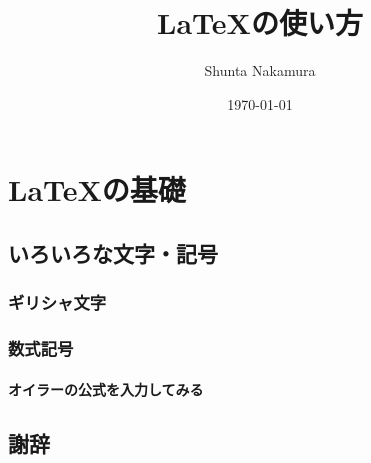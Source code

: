 \documentclass[a4paper, 11pt]{jsbook}
\title{\LaTeX{}の使い方}
\author{Shunta Nakamura}
\date{\today}
\begin{document}
\maketitle
\tableofcontents
\part{\LaTeX{}の基礎} %
    \chapter{いろいろな文字・記号}
        \section{ギリシャ文字}
        \section{数式記号}
            \subsection{オイラーの公式を入力してみる}

\chapter*{謝辞} %

\end{document}
